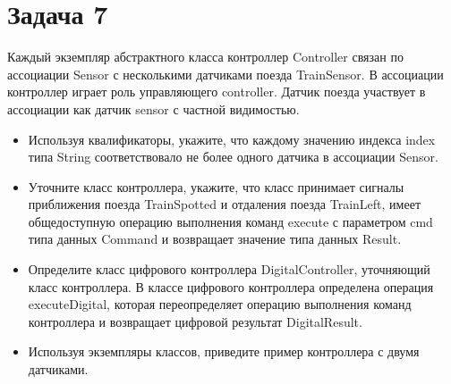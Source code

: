 \documentclass{article}
\begin{document}
\section{Задача 7}
Каждый экземпляр абстрактного класса контроллер Controller связан по ассоциации Sensor с несколькими датчиками поезда TrainSensor. В ассоциации контроллер играет роль управляющего controller. Датчик поезда участвует в ассоциации как датчик sensor с частной видимостью.

\begin{itemize}
    \item Используя квалификаторы, укажите, что каждому значению индекса index типа String соответствовало не более одного датчика в ассоциации Sensor.
    \item Уточните класс контроллера, укажите, что класс принимает сигналы приближения поезда TrainSpotted и отдаления поезда TrainLeft, имеет общедоступную операцию выполнения команд execute с параметром cmd типа данных Command и возвращает значение типа данных Result.
    \item Определите класс цифрового контроллера DigitalController, уточняющий класс контроллера. В классе цифрового контроллера определена операция executeDigital, которая переопределяет операцию выполнения команд контроллера и возвращает цифровой результат DigitalResult.
    \item Используя экземпляры классов, приведите пример контроллера с двумя датчиками.
\end{itemize}
\end{document}
